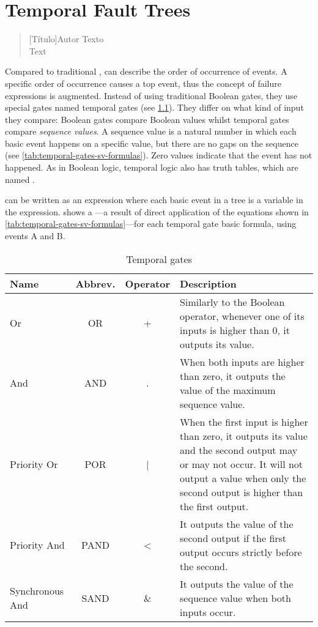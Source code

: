 \chapter{Temporal Fault Trees}
\label{sec:tft}

\begin{quotation}[Título]{Autor}
Texto \\
Text
\end{quotation}

Compared to traditional \FTs, \TFTs can describe the order of occurrence of events. A specific order of occurrence causes a top event, thus the concept of failure expressions is augmented. Instead of using traditional Boolean gates, they use special gates named temporal gates (see \cref{tab:temporal-gates}). They differ on what kind of input they compare: Boolean gates compare Boolean values whilst temporal gates compare \emph{sequence values}. A sequence value is a natural number in which each basic event happens on a specific value, but there are no gaps on the sequence (see \cref{tab:temporal-gates-sv-formulas}). Zero values indicate that the event has not happened. As in Boolean logic, temporal logic also has truth tables, which are named \TTTs.

\TFTs can be written as an expression where each basic event in a tree is a variable in the expression.  shows a \TTT---a result of direct application of the equations shown in \cref{tab:temporal-gates-sv-formulas}---for each temporal gate basic formula, using events A and B. 

\begin{table}
\caption{Temporal gates}
\label{tab:temporal-gates}
\center
\begin{tabular}{|l|c|c|p{6cm}|}
\hline
\textbf{Name} & \textbf{Abbrev.} & \textbf{Operator} & \textbf{Description}\\
\hline
\hline
Or & OR & + & Similarly to the Boolean operator, whenever one of its inputs is higher than $0$, it outputs its value.\\
\hline
And & AND & . & When both inputs are higher than zero, it outputs the value of the maximum sequence value.\\
\hline
Priority Or& POR & | & When the first input is higher than zero, it outputs its value and the second output may or may not occur. It will not output a value when only the second output is higher than the first output.\\
\hline
Priority And & PAND & < & It outputs the value of the second output if the first output occurs strictly before the second.\\
\hline
Synchronous And & SAND & \& & It outputs the value of the sequence value when both inputs occur.\\
\hline
\end{tabular}
\end{table}

